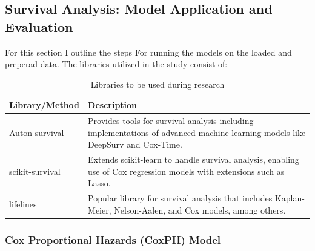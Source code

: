 \subsection{Survival Analysis: Model Application and Evaluation}

\noindent For this section I outline the steps For running the models on the loaded and preperad data. The libraries utilized in the study consist of:

\begin{table}[h]
\begin{tabularx}{\textwidth}{|X|X|}
\hline
Library/Method & Description \\
\hline
Auton-survival \parencite{nagpal_auton-survival_2022} & Provides tools for survival analysis including implementations of advanced machine learning models like DeepSurv and Cox-Time. \\
\hline
scikit-survival \parencite{sebastian_polsterl_scikit-survival_2023} & Extends scikit-learn \parencite{scikit-learn} to handle survival analysis, enabling use of Cox regression models with extensions such as Lasso. \\
\hline
lifelines \parencite{davidson-pilon_lifelines_2024} & Popular library for survival analysis that includes Kaplan-Meier, Nelson-Aalen, and Cox models, among others. \\
\hline
\end{tabularx}
\caption{Libraries to be used during research}
\label{tab:libs}
\end{table}

\subsubsection*{Cox Proportional Hazards (CoxPH) Model}

